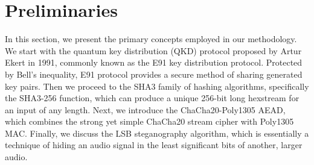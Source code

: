 \documentclass[12pt]{article}
\begin{document}
\section{Preliminaries}
\label{sec:preliminaries}
In this section, we present the primary concepts employed in our methodology. We start with the quantum key distribution (QKD) protocol proposed by Artur Ekert in 1991, commonly known as the E91 key distribution protocol. Protected by Bell's inequality, E91 protocol provides a secure method of sharing generated key pairs. Then we proceed to the SHA3 family of hashing algorithms, specifically the SHA3-256 function, which can produce a unique 256-bit long hexstream for an input of any length. Next, we introduce the ChaCha20-Poly1305 AEAD, which combines the strong yet simple ChaCha20 stream cipher with Poly1305 MAC. Finally, we discuss the LSB steganography algorithm, which is essentially a technique of hiding an audio signal in the least significant bits of another, larger audio.
\end{document}
